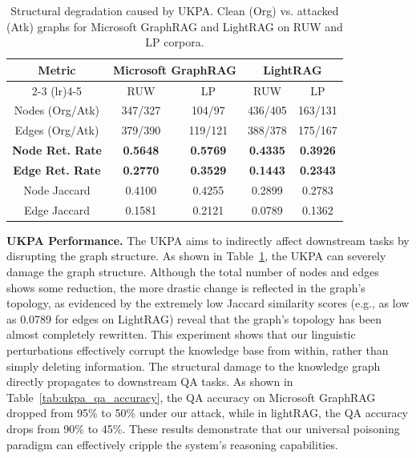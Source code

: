 \documentclass[letterpaper]{article} %
\begin{document}
\begin{table}[t]
\centering
\setlength{\tabcolsep}{4pt}
\small
\begin{tabular}{ccccc}
\toprule
\multirow{2}{*}{\textbf{Metric}} & \multicolumn{2}{c}{\textbf{Microsoft GraphRAG}} & \multicolumn{2}{c}{\textbf{LightRAG}} \\
\cmidrule(lr){2-3} \cmidrule(lr){4-5}
& RUW & LP & RUW & LP \\
\midrule
Nodes (Org/Atk) & 347/327 & 104/97 & 436/405 & 163/131 \\
Edges (Org/Atk) & 379/390 & 119/121 & 388/378 & 175/167 \\
\midrule
\textbf{Node Ret. Rate} & \textbf{0.5648} & \textbf{0.5769} & \textbf{0.4335} & \textbf{0.3926} \\
\textbf{Edge Ret. Rate} & \textbf{0.2770} & \textbf{0.3529} & \textbf{0.1443} & \textbf{0.2343} \\
Node Jaccard & 0.4100 & 0.4255 & 0.2899 & 0.2783 \\
Edge Jaccard & 0.1581 & 0.2121 & 0.0789 & 0.1362 \\
\bottomrule
\end{tabular}
\caption{Structural degradation caused by UKPA. Clean (Org) vs. attacked (Atk) graphs for Microsoft GraphRAG and LightRAG on RUW and LP corpora.} 
\label{tab:graybox_structure}
\end{table}

\textbf{UKPA Performance.}
The UKPA aims to indirectly affect downstream tasks by disrupting the graph structure. As shown in Table~\ref{tab:graybox_structure}, the UKPA can severely damage the graph structure. Although the total number of nodes and edges shows some reduction, the more drastic change is reflected in the graph's topology, as evidenced by the extremely low Jaccard similarity scores (e.g., as low as 0.0789 for edges on LightRAG) reveal that the graph's topology has been almost completely rewritten. This experiment shows that our linguistic perturbations effectively corrupt the knowledge base from within, rather than simply deleting information. The structural damage to the knowledge graph directly propagates to downstream QA tasks. As shown in Table~\ref{tab:ukpa_qa_accuracy}, the QA accuracy on Microsoft GraphRAG dropped from 95\% to 50\% under our attack, while in lightRAG, the QA accuracy drops from 90\% to 45\%. These results demonstrate that our universal poisoning paradigm can effectively cripple the system's reasoning capabilities.
\end{document}
